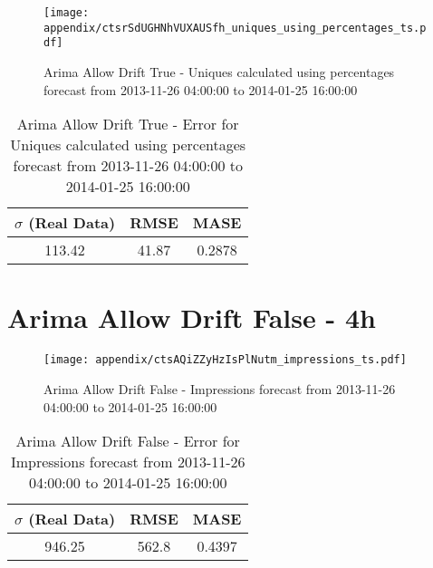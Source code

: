 \begin{figure}[H] \begin{center} \leavevmode
\texttt{[image: appendix/ctsrSdUGHNhVUXAUSfh\_uniques\_using\_percentages\_ts.pdf]} \caption{
Arima Allow Drift True - Uniques calculated using percentages forecast from 2013-11-26 04:00:00 to 2014-01-25 16:00:00} \label{fig:appendix/ctsrSdUGHNhVUXAUSfh_uniques_using_percentages_ts.pdf} \end{center}
\end{figure}

\begin{table}[H]
\centering
\footnotesize
\begin{tabular}{ccc}
$\sigma$ (Real Data) & RMSE & MASE   \\ \hline
113.42 & 41.87 & 0.2878 \\
\end{tabular}

\vspace{0.5cm}

\caption{
Arima Allow Drift True - Error for Uniques calculated using percentages forecast from 2013-11-26 04:00:00 to 2014-01-25 16:00:00}
\end{table}

\section{Arima Allow Drift False - 4h}
\begin{figure}[H] \begin{center} \leavevmode
\texttt{[image: appendix/ctsAQiZZyHzIsPlNutm\_impressions\_ts.pdf]} \caption{
Arima Allow Drift False - Impressions forecast from 2013-11-26 04:00:00 to 2014-01-25 16:00:00} \label{fig:appendix/ctsAQiZZyHzIsPlNutm_impressions_ts.pdf} \end{center}
\end{figure}

\begin{table}[H]
\centering
\footnotesize
\begin{tabular}{ccc}
$\sigma$ (Real Data) & RMSE & MASE   \\ \hline
946.25 & 562.8 & 0.4397 \\
\end{tabular}

\vspace{0.5cm}

\caption{
Arima Allow Drift False - Error for Impressions forecast from 2013-11-26 04:00:00 to 2014-01-25 16:00:00}
\end{table}

